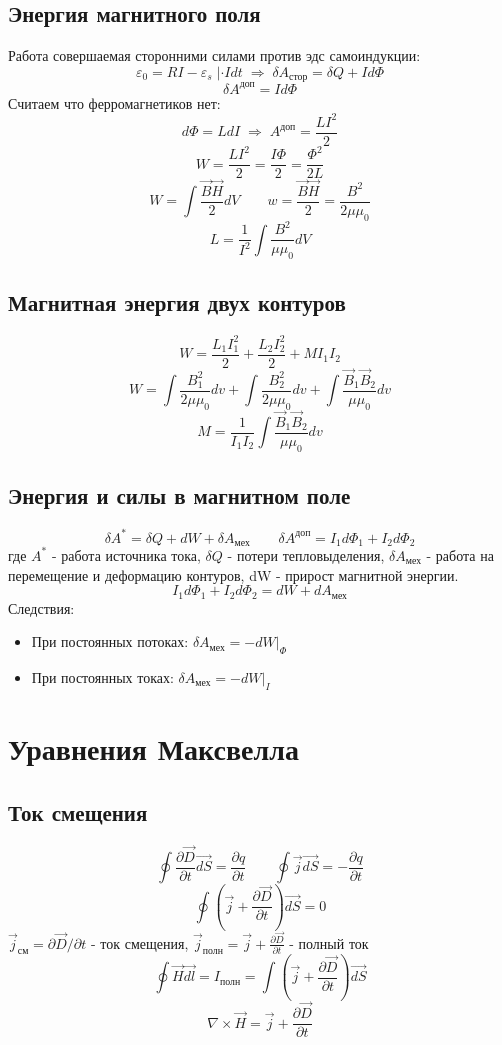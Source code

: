 \documentclass{article}
\begin{document}
\subsection{Энергия магнитного поля}
Работа совершаемая сторонними силами против эдс самоиндукции:
\[\varepsilon_{0}=RI-\varepsilon_{s} \; |\cdot Idt \; \Rightarrow \; \delta A_{\text{стор}}=\delta Q + Id\Phi\]
\[\delta A^{\text{доп}}=Id\Phi\]
Считаем что ферромагнетиков нет:
\[d\Phi=LdI \; \Rightarrow \; A^{\text{доп}}=\frac{LI^2}{2}\]
\[W=\frac{LI^2}{2}=\frac{I\Phi}{2}=\frac{\Phi^2}{2L}\]
\[W=\int\frac{\vec{B}\vec{H}}{2}dV \qquad w=\frac{\vec{B}\vec{H}}{2}=\frac{B^2}{2\mu\mu_{0}}\]
\[L=\frac{1}{I^2}\int\frac{B^2}{\mu\mu_{0}}dV\]

\subsection{Магнитная энергия двух контуров}
\[W=\frac{L_1I_1^2}{2}+\frac{L_2I_2^2}{2}+MI_1I_2\]
\[W=\int\frac{B_1^2}{2\mu\mu_0}dv+\int\frac{B_2^2}{2\mu\mu_0}dv+\int\frac{\vec{B}_1\vec{B}_2}{\mu\mu_0}dv\]
\[M=\frac{1}{I_1I_2}\int\frac{\vec{B}_1\vec{B}_2}{\mu\mu_0}dv\]

\subsection{Энергия и силы в магнитном поле}
\[\delta A^*=\delta Q + dW + \delta A_{\text{мех}} \qquad \delta A^{\text{доп}}=I_1d\Phi_1+I_2d\Phi_2\]
где $A^*$ - работа источника тока, $\delta Q$ - потери тепловыделения, $\delta A_{\text{мех}}$ - работа на перемещение и деформацию контуров, dW - прирост магнитной энергии.
\[I_1d\Phi_1+I_2d\Phi_2=dW+dA_{\text{мех}}\]
Следствия:
\begin{itemize}
    \item При постоянных потоках: $\delta A_{\text{мех}}=-dW \Big\rvert_{\Phi}$
    \item При постоянных токах: $\delta A_{\text{мех}}=-dW \Big\rvert_{I}$
\end{itemize}


\section{Уравнения Максвелла}

\subsection{Ток смещения}
\[\oint \frac{\partial \vec{D}}{\partial t}\vec{dS}=\frac{\partial q}{\partial t} \qquad \oint \vec{j}\vec{dS}=-\frac{\partial q}{\partial t}\]
\[\oint (\vec{j} + \frac{\partial \vec{D}}{\partial t})\vec{dS}=0\]
$\vec{j}_{\text{см}}=\partial\vec{D}/\partial t$ - ток смещения, $\vec{j}_{\text{полн}}=\vec{j}+\frac{\partial \vec{D}}{\partial t}$ - полный ток
\[\oint \vec{H}\vec{dl}=I_{\text{полн}}=\int(\vec{j}+\frac{\partial \vec{D}}{\partial t})\vec{dS}\]
\[\nabla \times \vec{H}=\vec{j}+\frac{\partial \vec{D}}{\partial t}\]
\end{document}
